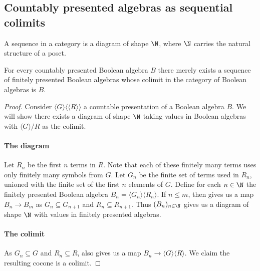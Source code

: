 \subsection{Countably presented algebras as sequential colimits}\label{secBooleAsColimits}

\begin{definition}
  A sequence in a category is a diagram of shape $\N$, 
  where $\N$ carries the natural structure of a poset. 
\end{definition}
\begin{lemma}\label{lemProFinitePresentation}
  For every countably presented Boolean algebra $B$
  there merely exists a sequence of finitely presented Boolean algebras 
  whose colimit in the category of Boolean algebras is $B$. 
\end{lemma}
\begin{proof}
  Consider $\langle G \rangle \langle\langle R \rangle\rangle$ a countable presentation of a Boolean algebra $B$. 
  We will show there exists a diagram of shape $\N$ taking values in Boolean algebras 
  with $\langle G\rangle / R$ as the colimit.
  \paragraph{The diagram}
  Let $R_n$ be the first $n$ terms in $R$. 
  Note that each of these finitely many terms uses only finitely many symbols from $G$.
  Let $G_n$ be the finite set of terms used in $R_n$, unioned with the finite set of the first $n$ elements of $G$. 
  Define for each $n\in\N$ the finitely presented Boolean algebra $B_n = \langle G_n \rangle  \langle R_n \rangle$. 
  If $n\leq m$, then  gives us a map $B_n \to B_m$ 
  as $G_n \subseteq G_{n+1}$ and $R_n \subseteq R_{n+1}$. 
  Thus $(B_n)_{n\in \N}$ gives us a diagram of shape $\N$
  with values in finitely presented algebras. 

  \paragraph{The colimit}
  As $G_n\subseteq G$ and $R_n \subseteq R$, 
   also gives us a map $B_n\to \langle G \rangle \langle R \rangle$. 
  We claim the resulting cocone is a colimit. 


\end{proof}
